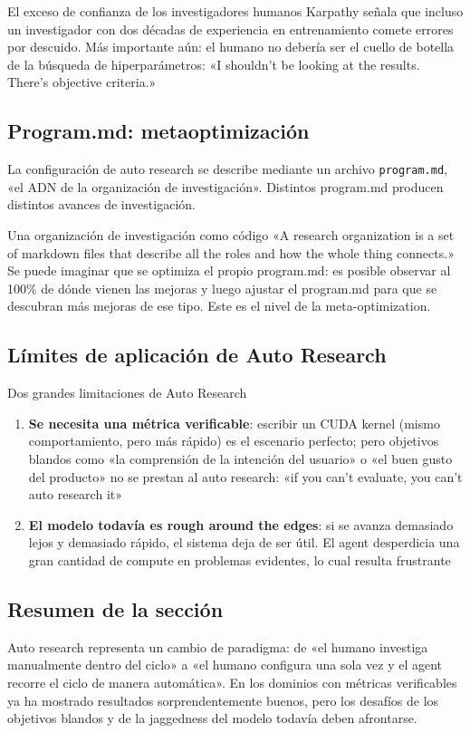 \begin{warningbox}{El exceso de confianza de los investigadores humanos}
Karpathy señala que incluso un investigador con dos décadas de experiencia en entrenamiento comete errores por descuido. Más importante aún: el humano no debería ser el cuello de botella de la búsqueda de hiperparámetros: «I shouldn't be looking at the results. There's objective criteria.»
\end{warningbox}

\subsection{Program.md: metaoptimización}

La configuración de auto research se describe mediante un archivo \texttt{program.md}, «el ADN de la organización de investigación». Distintos program.md producen distintos avances de investigación.

\begin{importantbox}{Una organización de investigación como código}
«A research organization is a set of markdown files that describe all the roles and how the whole thing connects.» Se puede imaginar que se optimiza el propio program.md: es posible observar al 100\% de dónde vienen las mejoras y luego ajustar el program.md para que se descubran más mejoras de ese tipo. Este es el nivel de la meta-optimization.
\end{importantbox}

\subsection{Límites de aplicación de Auto Research}

\begin{warningbox}{Dos grandes limitaciones de Auto Research}
\begin{enumerate}
    \item \textbf{Se necesita una métrica verificable}: escribir un CUDA kernel (mismo comportamiento, pero más rápido) es el escenario perfecto; pero objetivos blandos como «la comprensión de la intención del usuario» o «el buen gusto del producto» no se prestan al auto research: «if you can't evaluate, you can't auto research it»
    \item \textbf{El modelo todavía es rough around the edges}: si se avanza demasiado lejos y demasiado rápido, el sistema deja de ser útil. El agent desperdicia una gran cantidad de compute en problemas evidentes, lo cual resulta frustrante
\end{enumerate}
\end{warningbox}

\subsection{Resumen de la sección}

Auto research representa un cambio de paradigma: de «el humano investiga manualmente dentro del ciclo» a «el humano configura una sola vez y el agent recorre el ciclo de manera automática». En los dominios con métricas verificables ya ha mostrado resultados sorprendentemente buenos, pero los desafíos de los objetivos blandos y de la jaggedness del modelo todavía deben afrontarse.
